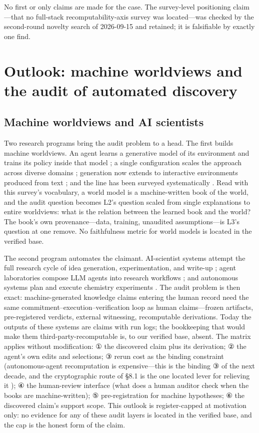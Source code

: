\documentclass[11pt,a4paper]{article}
\begin{document}
No first or only claims are made for the case. The survey-level positioning claim—that no full-stack recomputability-axis survey was located—was checked by the second-round novelty search of 2026-09-15 and retained; it is falsifiable by exactly one find.

\section{Outlook: machine worldviews and the audit of automated discovery}

\subsection{Machine worldviews and AI scientists}

Two research programs bring the audit problem to a head. The first builds machine worldviews. An agent learns a generative model of its environment and trains its policy inside that model \cite{key55}; a single configuration scales the approach across diverse domains \cite{key56}; generation now extends to interactive environments produced from text \cite{key57}; and the line has been surveyed systematically \cite{key58}. Read with this survey's vocabulary, a world model is a machine-written book of the world, and the audit question becomes L2's question scaled from single explanations to entire worldviews: what is the relation between the learned book and the world? The book's own provenance—data, training, unaudited assumptions—is L3's question at one remove. No faithfulness metric for world models is located in the verified base.

The second program automates the claimant. AI-scientist systems attempt the full research cycle of idea generation, experimentation, and write-up \cite{key59}; agent laboratories compose LLM agents into research workflows \cite{key60}; and autonomous systems plan and execute chemistry experiments \cite{key61}. The audit problem is then exact: machine-generated knowledge claims entering the human record need the same commitment–execution–verification loop as human claims—frozen artifacts, pre-registered verdicts, external witnessing, recomputable derivations. Today the outputs of these systems are claims with run logs; the bookkeeping that would make them third-party-recomputable is, to our verified base, absent. The matrix applies without modification: ① the discovered claim plus its derivation; ② the agent's own edits and selections; ③ rerun cost as the binding constraint (autonomous-agent recomputation is expensive—this is the binding ③ of the next decade, and the cryptographic route of §8.1 is the one located lever for relieving it \cite{key53}); ④ the human-review interface (what does a human auditor check when the books are machine-written); ⑤ pre-registration for machine hypotheses; ⑥ the discovered claim's support scope. This outlook is register-capped at motivation only: no evidence for any of these audit layers is located in the verified base, and the cap is the honest form of the claim.
\end{document}
